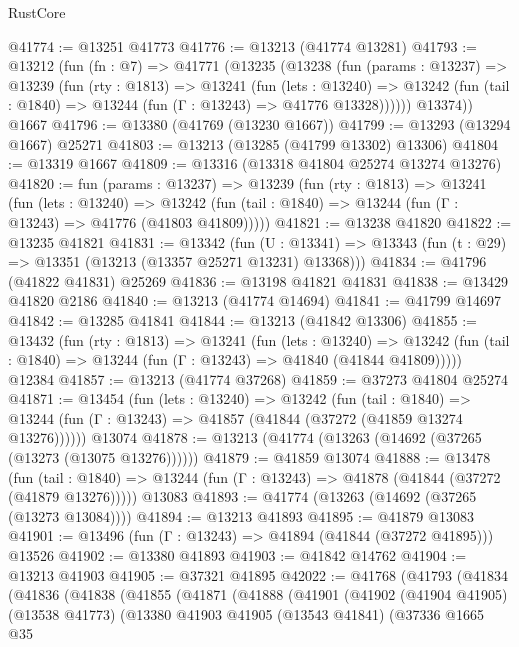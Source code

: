\begin{lexlean}{RustCore}
\begin{coremodule}
@41774 := @13251 @41773
@41776 := @13213 (@41774 @13281)
@41793 := @13212
    (fun (fn : @7) =>
    @41771
      (@13235
        (@13238
          (fun (params : @13237) =>
          @13239
            (fun (rty : @1813) =>
            @13241
              (fun (lets : @13240) =>
              @13242 (fun (tail : @1840) => @13244 (fun (Γ : @13243) => @41776 @13328))))))
        @13374))
    @1667
@41796 := @13380 (@41769 (@13230 @1667))
@41799 := @13293 (@13294 @1667) @25271
@41803 := @13213 (@13285 (@41799 @13302) @13306)
@41804 := @13319 @1667
@41809 := @13316 (@13318 @41804 @25274 @13274 @13276)
@41820 := fun (params : @13237) =>
  @13239
    (fun (rty : @1813) =>
    @13241
      (fun (lets : @13240) =>
      @13242 (fun (tail : @1840) => @13244 (fun (Γ : @13243) => @41776 (@41803 @41809)))))
@41821 := @13238 @41820
@41822 := @13235 @41821
@41831 := @13342
    (fun (U : @13341) => @13343 (fun (t : @29) => @13351 (@13213 (@13357 @25271 @13231) @13368)))
@41834 := @41796 (@41822 @41831) @25269
@41836 := @13198 @41821 @41831
@41838 := @13429 @41820 @2186
@41840 := @13213 (@41774 @14694)
@41841 := @41799 @14697
@41842 := @13285 @41841
@41844 := @13213 (@41842 @13306)
@41855 := @13432
    (fun (rty : @1813) =>
    @13241
      (fun (lets : @13240) =>
      @13242 (fun (tail : @1840) => @13244 (fun (Γ : @13243) => @41840 (@41844 @41809)))))
    @12384
@41857 := @13213 (@41774 @37268)
@41859 := @37273 @41804 @25274
@41871 := @13454
    (fun (lets : @13240) =>
    @13242
      (fun (tail : @1840) =>
      @13244 (fun (Γ : @13243) => @41857 (@41844 (@37272 (@41859 @13274 @13276))))))
    @13074
@41878 := @13213 (@41774 (@13263 (@14692 (@37265 (@13273 (@13075 @13276))))))
@41879 := @41859 @13074
@41888 := @13478
    (fun (tail : @1840) => @13244 (fun (Γ : @13243) => @41878 (@41844 (@37272 (@41879 @13276)))))
    @13083
@41893 := @41774 (@13263 (@14692 (@37265 (@13273 @13084))))
@41894 := @13213 @41893
@41895 := @41879 @13083
@41901 := @13496 (fun (Γ : @13243) => @41894 (@41844 (@37272 @41895))) @13526
@41902 := @13380 @41893
@41903 := @41842 @14762
@41904 := @13213 @41903
@41905 := @37321 @41895
@42022 := @41768
    (@41793
      (@41834
        (@41836
          (@41838
            (@41855
              (@41871
                (@41888
                  (@41901
                    (@41902
                      (@41904 @41905)
                      (@13538 @41773)
                      (@13380
                        @41903
                        @41905
                        (@13543 @41841)
                        (@37336
                          @1665
                          @35

\end{coremodule}
\end{lexlean}
